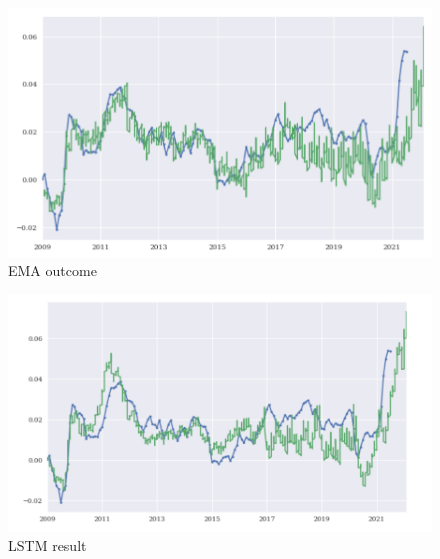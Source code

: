 \documentclass[reqno]{amsart}
\theoremstyle{definition}
\begin{document}
\begin{figure}[t]
\centering
\caption{EMA outcome}
\includegraphics[scale=0.8]{EMA.png}
\end{figure}

\begin{figure}[t]
\centering
\caption{LSTM result}
\includegraphics[scale=0.8]{LSTM2.png}
\end{figure}
\end{document}
